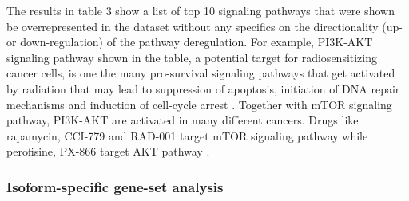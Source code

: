 \documentclass[hidelinks,11pt]{article}
\begin{document}
\begin{table}[ht]
\begin{center}
\label{table:design}
\end{center}
\caption{A list of top 10 over-represented KEGG pathways based on the functional enrichment of our DE gene list.}
\end{table} 

The results in table 3 show a list of top 10 signaling pathways that were shown be overrepresented in the dataset without any specifics on the directionality (up- or down-regulation) of the pathway deregulation. For example, PI3K-AKT signaling pathway shown in the table, a potential target for radiosensitizing cancer cells, is one the many pro-survival signaling pathways that get activated by radiation that may lead to suppression of apoptosis, initiation of DNA repair mechanisms and induction of cell-cycle arrest \cite{pi3k}. Together with mTOR signaling pathway, PI3K-AKT are activated in many different cancers. Drugs like rapamycin, CCI-779 and RAD-001 target mTOR signaling pathway while perofisine, PX-866 target AKT pathway \cite{pi3k_drugs}.

\subsubsection*{Isoform-specific gene-set analysis}
\end{document}
